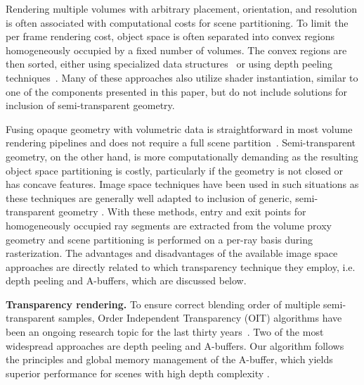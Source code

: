 \documentclass{egpubl}
\newcommand{\yellow}[1]{{\color{Goldenrod}#1}}
\newcommand{\minor}[1]{\yellow{#1}}
\newcommand{\ab}{\mbox{A-buffer}}
\begin{document}
Rendering multiple volumes with arbitrary placement, orientation, and resolution is often associated with computational costs for scene partitioning. 
To limit the per frame rendering cost, object space is often separated into convex regions homogeneously occupied by a fixed number of volumes. 
The convex regions are then sorted, either using specialized data structures~\cite{grimm04vobjects,lindholm2009fused,Lux2009} or using depth peeling techniques~\cite{Plate2007,rossler08multishader}. 
Many of these approaches also utilize shader instantiation, similar to one of the components presented in this paper, but do not include solutions for inclusion of semi-transparent geometry. 

Fusing opaque geometry with volumetric data is straightforward in most volume rendering pipelines and does not require a full scene partition~\cite{engel2006volume}. 
Semi-transparent geometry, on the other hand, is more computationally demanding as the resulting object space partitioning is costly, particularly if the geometry is not closed or has concave features. 
Image space techniques have been used in such situations as these techniques are generally well adapted to inclusion of generic, semi-transparent geometry \cite{brecheisen08multimodal,kainz2009ray}. 
With these methods, entry and exit points for homogeneously occupied ray segments are extracted from the volume proxy geometry and scene partitioning is performed on a per-ray basis during rasterization.
The advantages and disadvantages of the available image space approaches are directly related to which transparency technique they employ, i.e. depth peeling and \ab{}s, which are discussed below. 


\noindent\textbf{Transparency rendering.}
%
To ensure correct blending order of multiple semi-transparent samples, Order Independent Transparency (OIT) algorithms have been an ongoing research topic for the last thirty years\minor{~\cite{Maule2011}}. 
Two of the most widespread approaches are depth peeling and \ab{}s. 
Our algorithm follows the principles and global memory management of the \ab{}, which yields superior performance for scenes with high depth complexity \cite{Yang2010,Kauker2013}. 

\end{document}
